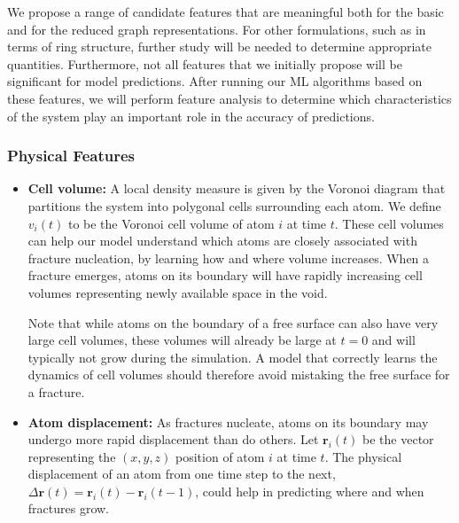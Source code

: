 We propose a range of candidate features that are meaningful both for the basic and for the reduced graph representations.  For other formulations, such as in terms of ring structure, further study will be needed to determine appropriate quantities.  Furthermore, not all features that we initially propose will be significant for model predictions.  After running our ML algorithms based on these features, we will perform feature analysis to determine which characteristics of the system play an important role in the accuracy of predictions.

\subsubsection{Physical Features}
\label{subsubsec: Physical Features}

\begin{itemize}
    
    \item \textbf{Cell volume:} A local density measure is given by the Voronoi diagram that partitions the system into polygonal cells surrounding each atom.  We define $v_i(t)$ to be the Voronoi cell volume of atom $i$ at time $t$.  These cell volumes can help our model understand which atoms are closely associated with fracture nucleation, by learning how and where volume increases.  When a fracture emerges, atoms on its boundary will have rapidly increasing cell volumes representing newly available space in the void.
    
    Note that while atoms on the boundary of a free surface can also have very large cell volumes, these volumes will already be large at $t=0$ and will typically not grow during the simulation.  A model that correctly learns the dynamics of cell volumes should therefore avoid mistaking the free surface for a fracture.

    \item \textbf{Atom displacement:} As fractures nucleate, atoms on its boundary may undergo more rapid displacement than do others.  Let $\mathbf{r}_i(t)$ be the vector representing the $(x,y,z)$ position of atom $i$ at time $t$. The physical displacement of an atom from one time step to the next, $\Delta \mathbf{r}(t)=\mathbf{r}_i(t)-\mathbf{r}_i(t-1)$, could help in predicting where and when fractures grow. 


\end{itemize}
